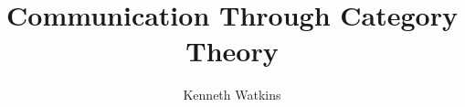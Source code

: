 \documentclass{article}
\title{Communication Through Category Theory}
\author{Kenneth Watkins}
\begin{document}
\maketitle
\tableofcontents

\pagebreak
%
\pagebreak

\end{document}
